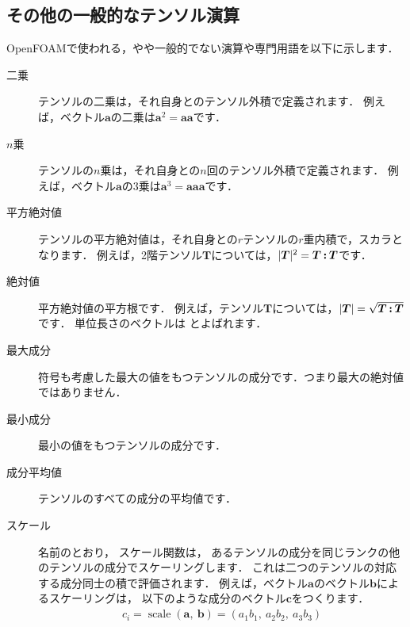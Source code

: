 \subsection{その他の一般的なテンソル演算}
\label{ssec:1.3.6}
OpenFOAMで使われる，やや一般的でない演算や専門用語を以下に示します．
\begin{description}
 \item[二乗]
%
            テンソルの二乗は，それ自身とのテンソル外積で定義されます．
            例えば，ベクトル$\bm{a}$の二乗は$\bm{a}^{2} = \bm{a}\bm{a}$です．
 \item[$n$乗]
%
            テンソルの$n$乗は，それ自身との$n$回のテンソル外積で定義されます．
            例えば，ベクトル$\bm{a}$の$3$乗は$\bm{a}^{3} = \bm{a}\bm{a}\bm{a}$です．
 \item[平方絶対値]
%
            テンソルの平方絶対値は，それ自身との$r$テンソルの$r$重内積で，スカラとなります．
            例えば，2階テンソル$\bm{T}$については，$|\bm{T}|^{2} = \bm{T} \biInProd \bm{T}$です．
 \item[絶対値]
%
            平方絶対値の平方根です．
            例えば，テンソル$\bm{T}$については，$|\bm{T}| = \sqrt{\bm{T} \biInProd \bm{T}}$です．
            単位長さのベクトルは
%
            とよばれます．
 \item[最大成分]
%
            符号も考慮した最大の値をもつテンソルの成分です．つまり最大の絶対値ではありません．
 \item[最小成分]
%
            最小の値をもつテンソルの成分です．
 \item[成分平均値]
%
            テンソルのすべての成分の平均値です．
 \item[スケール] 名前のとおり，
%
            スケール関数は，
            あるテンソルの成分を同じランクの他のテンソルの成分でスケーリングします．
            これは二つのテンソルの対応する成分同士の積で評価されます．
            例えば，ベクトル$\bm{a}$のベクトル$\bm{b}$によるスケーリングは，
            以下のような成分のベクトル$\bm{c}$をつくります．
            \begin{align}
             \label{eq:1.24}
             c_{i} = \mathop{\mathrm{scale}}(\bm{a},\ \bm{b})
             = (a_{1}b_{1},\ a_{2}b_{2},\ a_{3}b_{3})
            \end{align}
\end{description}


